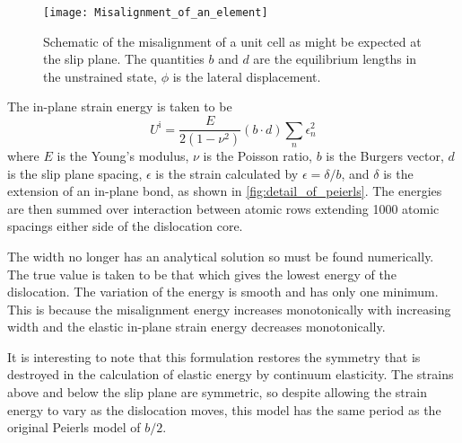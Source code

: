 \begin{figure}
\centering
\texttt{[image: Misalignment\_of\_an\_element]}
\captionsetup{width=0.5\textwidth}
\caption[Schematic of a misaligned unit cell]{Schematic of the misalignment of a unit cell as might be expected at the slip plane. The quantities $b$ and $d$ are the equilibrium lengths in the unstrained state, $\phi$ is the lateral displacement. \label{fig:schematic_misalignment}}
\end{figure}

The in-plane strain energy is taken to be 
\begin{equation}
U^{\text{i}} = \frac{E}{2(1-\nu^2)} (b\cdot d) \sum_n \epsilon_n^2
\end{equation}
where $E$ is the Young's modulus, $\nu$ is the Poisson ratio, $b$ is the Burgers vector, $d$ is the slip plane spacing, $\epsilon$ is the strain calculated by $\epsilon = \delta/b$, and $\delta$ is the extension of an in-plane bond, as shown in \autoref{fig:detail_of_peierls}. The energies are then summed over interaction between atomic rows extending 1000 atomic spacings either side of the dislocation core.

The width no longer has an analytical solution so must be found numerically. The true value is taken to be that which gives the lowest energy of the dislocation. The variation of the energy is smooth and has only one minimum. This is because the misalignment energy increases monotonically with increasing width and the elastic in-plane strain energy decreases  monotonically.

It is interesting to note that this formulation restores the symmetry that is destroyed in the calculation of elastic energy by continuum elasticity. The strains above and below the slip plane are symmetric, so despite allowing the strain energy to vary as the dislocation moves, this model has the same period as the original Peierls model of $b/2$.




